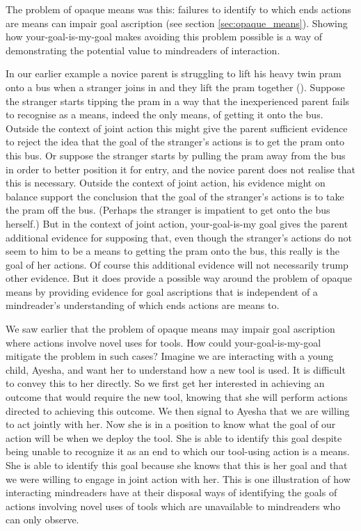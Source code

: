 \documentclass[14pt,a4paper]{extarticle}
\begin{document}
The problem of opaque means was this:
 failures to identify to which ends actions are means can impair goal ascription (see section \vref{sec:opaque_means}).
Showing how your-goal-is-my-goal makes  avoiding this problem possible is a way of demonstrating the potential value  to mindreaders of interaction. 

In our earlier example 
a novice parent is struggling to lift his heavy twin pram onto a bus when a stranger joins in and they lift the pram together ().
Suppose the stranger starts tipping the pram in a way that the inexperienced parent fails to recognise as a means, indeed the only means, of getting it onto the bus.
Outside the context of joint action this might give the parent sufficient evidence to reject the idea that the goal of the stranger's actions is to get the pram onto this bus.
Or suppose the stranger starts by pulling the pram away from the bus in order to better position it for entry,
and the novice parent does not realise that this is necessary.
Outside the context of joint action, 
his evidence might on balance support the conclusion that the goal of the stranger's actions is to take the pram off the bus.
(Perhaps the stranger is impatient to get onto the bus herself.)
But in the context of joint action,
your-goal-is-my goal gives the parent  additional evidence for supposing that, 
even though the stranger's actions do not seem to him to be a means to getting the pram onto the bus, 
this really is the goal of her actions.
Of course this additional evidence will not necessarily trump   other evidence.
But it does provide a possible way around the problem of opaque means by providing evidence for goal ascriptions that is independent of a mindreader's understanding of which ends actions are means to.

We saw earlier that the problem of opaque means  may impair goal ascription where actions involve novel uses for tools.
How could your-goal-is-my-goal mitigate the problem in such cases?
Imagine we are interacting with a young child,
Ayesha,
and want her to understand how a new tool is used.  
It is difficult to convey this to her directly.  
So we first get her interested in achieving an outcome that would require the new tool,
knowing that she will perform actions directed to achieving this outcome.  
We then signal to Ayesha that we are willing to act jointly with her.  
Now she is in a position to know what the goal of our action will be when we deploy the tool.  
She is able to identify this goal 
despite being unable to recognize it as an end to which our tool-using action is a means.
She is able to identify this goal 
because she knows that this is her goal
and that we were willing to engage in joint action with her.
This is one illustration of how 
interacting mindreaders have at their disposal ways of
identifying the goals of actions involving novel uses of tools
which are unavailable to mindreaders who can only observe.
\end{document}
